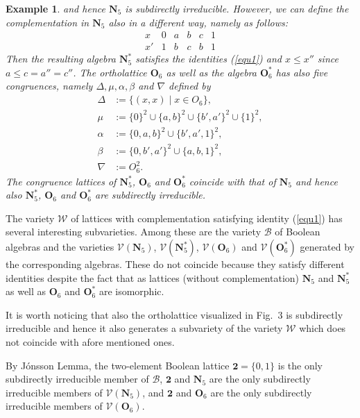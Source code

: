 \documentclass[12pt]{article}
\newtheorem{example}[theorem]{Example}
\begin{document}
\begin{example}
\vspace*{10mm}

and hence $\mathbf N_5$ is subdirectly irreducible. However, we can define the complementation in $\mathbf N_5$ also in a different way, namely as follows:
\[
\begin{array}{l|ccccc}
x  & 0 & a & b & c & 1 \\
\hline
x' & 1 & b & c & b & 1
\end{array}
\]
Then the resulting algebra $\mathbf N_5^*$ satisfies the identities {\rm(\ref{equ1})} and $x\le x''$ since $a\le c=a''=c''$. The ortholattice $\mathbf O_6$ as well as the algebra $\mathbf O_6^*$ has also five congruences, namely $\Delta,\mu,\alpha,\beta$ and $\nabla$ defined by
\begin{align*}
\Delta & :=\{(x,x)\mid x\in O_6\}, \\
   \mu & :=\{0\}^2\cup\{a,b\}^2\cup\{b',a'\}^2\cup\{1\}^2, \\
\alpha & :=\{0,a,b\}^2\cup\{b',a',1\}^2, \\
 \beta & :=\{0,b',a'\}^2\cup\{a,b,1\}^2, \\
\nabla & :=O_6^2.
\end{align*}
The congruence lattices of $\mathbf N_5^*$, $\mathbf O_6$ and $\mathbf O_6^*$ coincide with that of $\mathbf N_5$ and hence also $\mathbf N_5^*$, $\mathbf O_6$ and $\mathbf O_6^*$ are subdirectly irreducible.
\end{example}

The variety $\mathcal W$ of lattices with complementation satisfying identity {\rm(\ref{equ1})} has several interesting subvarieties. Among these are the variety $\mathcal B$ of Boolean algebras and the varieties $\mathcal V(\mathbf N_5)$, $\mathcal V(\mathbf N_5^*)$, $\mathcal V(\mathbf O_6)$ and $\mathcal V(\mathbf O_6^*)$ generated by the corresponding algebras. These do not coincide because they satisfy different identities despite the fact that as lattices (without complementation) $\mathbf N_5$ and $\mathbf N_5^*$ as well as $\mathbf O_6$ and $\mathbf O_6^*$ are isomorphic.

It is worth noticing that also the ortholattice visualized in Fig.~3 is subdirectly irreducible and hence it also generates a subvariety of the variety $\mathcal W$ which does not coincide with afore mentioned ones.

By J\'onsson Lemma, the two-element Boolean lattice $\mathbf2=\{0,1\}$ is the only subdirectly irreducible member of $\mathcal B$, $\mathbf2$ and $\mathbf N_5$ are the only subdirectly irreducible members of $\mathcal V(\mathbf N_5)$, and $\mathbf2$ and $\mathbf O_6$ are the only subdirectly irreducible members of $\mathcal V(\mathbf O_6)$.
\end{document}
